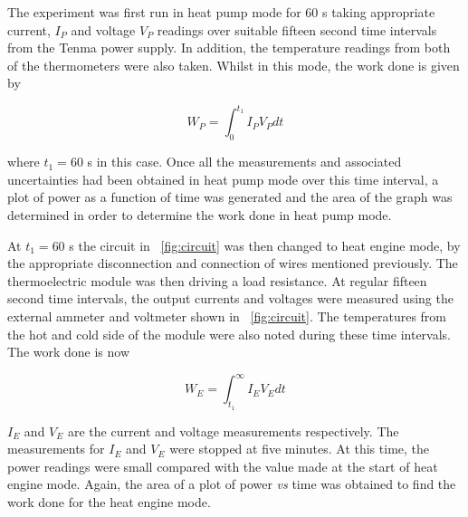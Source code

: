 \documentclass{article}
\newcommand{\figref}[2][\figurename~]{#1\ref{#2}}
\begin{document}
\vspace{2mm}  
\noindent
The experiment was first run in heat pump mode for 60 s taking appropriate current, $I_P$ and voltage $V_P$ readings over suitable fifteen second time intervals from the Tenma power supply. In addition, the temperature readings from both of the thermometers were also taken. Whilst in this mode, the work done is given by

\begin{equation}
\label{eq:pump-work}
W_P = \int_{0}^{t_1} I_P V_P dt
\end{equation}

\vspace{2mm}  
\noindent
where $t_1 = 60$ s in this case. Once all the measurements and associated uncertainties had been obtained in heat pump mode over this time interval, a plot of power as a function of time was generated and the area of the graph was determined in order to determine the work done in heat pump mode. 

\vspace{2mm}  
\noindent
At $t_1 = 60$ s the circuit in \figref{fig:circuit} was then changed to heat engine mode, by the appropriate disconnection and connection of wires mentioned previously. The thermoelectric module was then driving a load resistance. At regular fifteen second time intervals, the output currents and voltages were measured using the external ammeter and voltmeter shown in \figref{fig:circuit}. The temperatures from the hot and cold side of the module were also noted during these time intervals. The work done is now

\begin{equation}
\label{eq:engine-work}
W_E = \int_{t_1}^{\infty} I_E V_E dt
\end{equation}

\vspace{2mm}  
\noindent
$I_E$ and $V_E$ are the current and voltage measurements respectively. The measurements for $I_E$ and $V_E$ were stopped at five minutes. At this time, the power readings were small compared with the value made at the start of heat engine mode. Again, the area of a plot of power \textit{vs} time was obtained to find the work done for the heat engine mode. 

\end{document}
